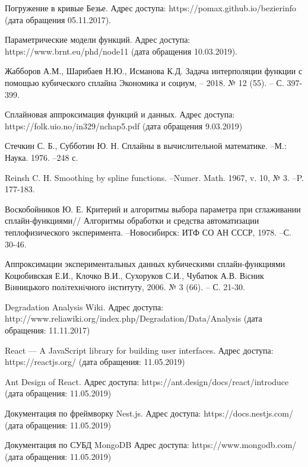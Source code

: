 \begin{thebibliography}{00}
Погружение в кривые Безье. 
Адрес доступа: https://pomax.github.io/bezierinfo (дата обращения 05.11.2017).

Параметрические модели функций.
Адрес доступа: https://www.brnt.eu/phd/node11 (дата обращения 10.03.2019). 

Жабборов А.М., Шарибаев Н.Ю., Исманова К.Д.
Задача интерполяции функции с помощью кубического сплайна
Экономика и социум, -- 2018. № 12 (55). -- С. 397-399. 

Сплайновая аппроксимация функций и данных.
Адрес доступа: https://folk.uio.no/in329/nchap5.pdf (дата обращения 9.03.2019)

Стечкин С. Б., Субботин Ю. Н. Сплайны в вычислительной математике. --М.: 
Наука. 1976. --248 с.
    
Reinsh C. H. Smoothing by spline functions. --Numer. Math. 1967, v. 10, № 3. --P. 177-183. 	 

Воскобойников Ю. Е. Критерий и алгоритмы выбора параметра при сглаживании сплайн-функциями//
Алгоритмы обработки и средства автоматизации теплофизического эксперимента. --Новосибирск: ИТФ СО АН СССР, 1978. --С. 30-46.    

Аппроксимации экспериментальных данных кубическими сплайн-функциями
Коцюбивская Е.И., Клочко В.И., Сухоруков С.И., Чубатюк А.В.
Вiсник Вiнницького полiтехнiчного iнституту, 2006. № 3 (66). -- С. 21-30.

Degradation Analysis Wiki.
Адрес доступа: http://www.reliawiki.org/index.php/Degradation/Data/Analysis (дата обращения: 11.11.2017)

React --- A JavaScript library for building user interfaces.
Адрес доступа: https://reactjs.org/ (дата обращения: 11.05.2019)

Ant Design of React.
Адрес доступа: https://ant.design/docs/react/introduce (дата обращения: 11.05.2019)

Документация по фреймворку Nest.js.
Адрес доступа: https://docs.nestjs.com/ (дата обращения: 11.05.2019)
 
Документация по СУБД MongoDB
Адрес доступа: https://www.mongodb.com/ (дата обращения: 11.05.2019)





\end{thebibliography}
